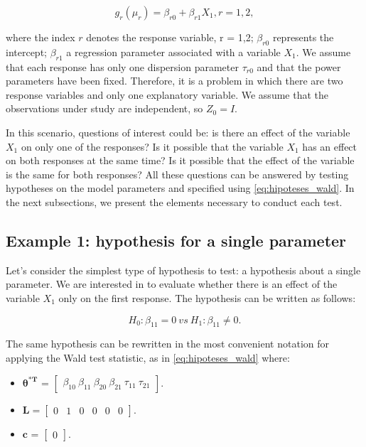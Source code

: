 \documentclass[USenglish]{article}
\theoremstyle{dgthm}
\theoremstyle{dgdef}
\begin{document}
\begin{equation}
\label{eq:pred_ex}
g_r(\mu_r) = \beta_{r0} + \beta_{r1} X_1, r=1,2,
\end{equation}

\noindent where the index $r$ denotes the response variable, r = 1,2; $\beta_{r0}$ represents the intercept; $\beta_{r1}$ a regression parameter associated with a variable $X_1$. We assume that each response has only one dispersion parameter $\tau_{r0}$ and that the power parameters have been fixed. Therefore, it is a problem in which there are two response variables and only one explanatory variable. We assume that the observations under study are independent, so $Z_0 = I$. 

In this scenario, questions of interest could be: is there an effect of the variable $X_1$ on only one of the responses? Is it possible that the variable $X_1$ has an effect on both responses at the same time? Is it possible that the effect of the variable is the same for both responses? All these questions can be answered by testing hypotheses on the model parameters and specified using \autoref{eq:hipoteses_wald}. In the next subsections, we present the elements necessary to conduct each test.

\subsection{Example 1: hypothesis for a single parameter}

Let's consider the simplest type of hypothesis to test: a hypothesis about a single parameter. We are interested in to evaluate whether there is an effect of the variable $X_1$ only on the first response. The hypothesis can be written as follows:

\begin{equation}
\label{eq:ex1}
H_0: \beta_{11} = 0 \ vs \ H_1: \beta_{11} \neq 0.
\end{equation}

The same hypothesis can be rewritten in the most convenient notation for applying the Wald test statistic, as in \autoref{eq:hipoteses_wald} where:

\begin{itemize}
  
  \item $\boldsymbol{\theta^{*T}}$ = $\begin{bmatrix} \beta_{10} \  \beta_{11} \ \beta_{20} \ \beta_{21} \ \tau_{11} \ \tau_{21} \end{bmatrix}$.

\item $\boldsymbol{L} = \begin{bmatrix} 0 & 1 & 0 & 0 & 0 & 0  \end{bmatrix}.$
 
\item $\boldsymbol{c}$ = $\begin{bmatrix} 0 \end{bmatrix}.$

\end{itemize}
\end{document}
